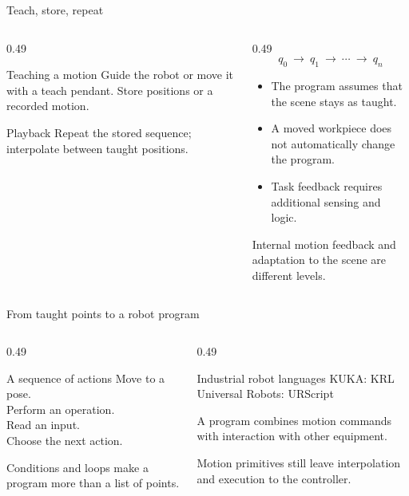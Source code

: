 \documentclass[aspectratio=169]{beamer}
\begin{document}
\begin{frame}[t]{Teach, store, repeat}
    \begin{columns}[T,onlytextwidth]
        \begin{column}{0.49\textwidth}
            \begin{block}{Teaching a motion}
                Guide the robot or move it with a teach pendant. Store positions or a recorded motion.
            \end{block}
            \begin{block}{Playback}
                Repeat the stored sequence; interpolate between taught positions.
            \end{block}
        \end{column}
        \begin{column}{0.49\textwidth}
            \[q_0\ \longrightarrow\ q_1\ \longrightarrow\ \cdots\ \longrightarrow\ q_n\]
            \begin{itemize}
                \item The program assumes that the scene stays as taught.
                \item A moved workpiece does not automatically change the program.
                \item Task feedback requires additional sensing and logic.
            \end{itemize}
            \small Internal motion feedback and adaptation to the scene are different levels.
        \end{column}
    \end{columns}
\end{frame}

\begin{frame}[t]{From taught points to a robot program}
    \begin{columns}[T,onlytextwidth]
        \begin{column}{0.49\textwidth}
            \begin{block}{A sequence of actions}
                Move to a pose.\\
                Perform an operation.\\
                Read an input.\\
                Choose the next action.
            \end{block}
            Conditions and loops make a program more than a list of points.
        \end{column}
        \begin{column}{0.49\textwidth}
            \begin{block}{Industrial robot languages}
                KUKA: KRL\\
                Universal Robots: URScript
            \end{block}
            A program combines motion commands with interaction with other equipment.
            \medskip

            Motion primitives still leave interpolation and execution to the controller.
        \end{column}
    \end{columns}
\end{frame}
\end{document}
